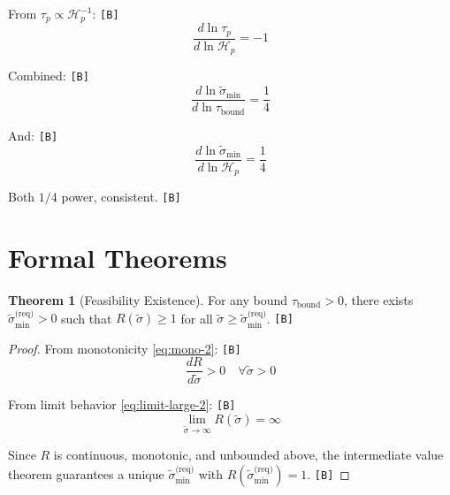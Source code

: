 \documentclass[11pt,a4paper]{article}
\newcommand{\tagB}{\textcolor{purple!70!black}{\texttt{[B]}}}
\theoremstyle{definition}
\newtheorem{theorem}{Theorem}[section]
\begin{document}
From $\tau_p \propto \mathcal{H}_p^{-1}$: \tagB{}
\begin{equation}
\label{eq:cv-sens-2}
\frac{d\ln\tau_p}{d\ln\mathcal{H}_p} = -1
\end{equation}

Combined: \tagB{}
\begin{equation}
\label{eq:cv-sens-3}
\frac{d\ln\tilde{\sigma}_{\min}}{d\ln\tau_{\text{bound}}} = \frac{1}{4}
\end{equation}

And: \tagB{}
\begin{equation}
\label{eq:cv-sens-4}
\frac{d\ln\tilde{\sigma}_{\min}}{d\ln\mathcal{H}_p} = \frac{1}{4}
\end{equation}

Both $1/4$ power, consistent. \tagB{}

\section{Formal Theorems}
\label{sec:theorems}

\begin{theorem}[Feasibility Existence]
\label{thm:feasibility}
For any bound $\tau_{\text{bound}} > 0$, there exists $\tilde{\sigma}_{\min}^{\text{(req)}} > 0$ such that
$R(\tilde{\sigma}) \geq 1$ for all $\tilde{\sigma} \geq \tilde{\sigma}_{\min}^{\text{(req)}}$. \tagB{}
\end{theorem}

\begin{proof}
From monotonicity \cref{eq:mono-2}: \tagB{}
\begin{equation}
\label{eq:thm1-mono}
\frac{dR}{d\tilde{\sigma}} > 0 \quad \forall \tilde{\sigma} > 0
\end{equation}

From limit behavior \cref{eq:limit-large-2}: \tagB{}
\begin{equation}
\label{eq:thm1-limit}
\lim_{\tilde{\sigma} \to \infty} R(\tilde{\sigma}) = \infty
\end{equation}

Since $R$ is continuous, monotonic, and unbounded above, the intermediate value theorem guarantees
a unique $\tilde{\sigma}_{\min}^{\text{(req)}}$ with $R(\tilde{\sigma}_{\min}^{\text{(req)}}) = 1$. \tagB{}
\end{proof}
\end{document}
